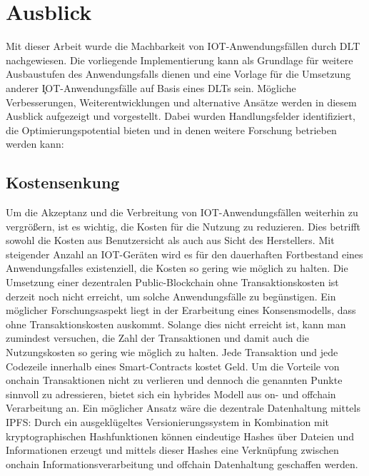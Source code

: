 \chapter{Ausblick}
\label{ch:perspective}
Mit dieser Arbeit wurde die Machbarkeit von \ac{IOT}-Anwendungsfällen durch \ac{DLT} nachgewiesen. Die vorliegende Implementierung kann als Grundlage für weitere Ausbaustufen des Anwendungsfalls dienen und eine Vorlage für die Umsetzung anderer \c{IOT}-Anwendungsfälle auf Basis eines \ac{DLT}s sein. Mögliche Verbesserungen, Weiterentwicklungen und alternative Ansätze werden in diesem Ausblick aufgezeigt und vorgestellt. Dabei wurden Handlungsfelder identifiziert, die Optimierungspotential bieten und in denen weitere Forschung betrieben werden kann:\\


\section{Kostensenkung}
\label{sec:perspective:costs}
Um die Akzeptanz und die Verbreitung von \ac{IOT}-Anwendungsfällen weiterhin zu vergrößern, ist es wichtig, die Kosten für die Nutzung zu reduzieren. Dies betrifft sowohl die Kosten aus Benutzersicht als auch aus Sicht des Herstellers. Mit steigender Anzahl an \ac{IOT}-Geräten wird es für den dauerhaften Fortbestand eines Anwendungsfalles existenziell, die Kosten so gering wie möglich zu halten. Die Umsetzung einer dezentralen Public-Blockchain ohne Transaktionskosten ist derzeit noch nicht erreicht, um solche Anwendungsfälle zu begünstigen. Ein möglicher Forschungsaspekt liegt in der Erarbeitung eines Konsensmodells, dass ohne Transaktionskosten auskommt. Solange dies nicht erreicht ist, kann man zumindest versuchen, die Zahl der Transaktionen und damit auch die Nutzungskosten so gering wie möglich zu halten. Jede Transaktion und jede Codezeile innerhalb eines Smart-Contracts kostet Geld. Um die Vorteile von onchain Transaktionen nicht zu verlieren und dennoch die genannten Punkte sinnvoll zu adressieren, bietet sich ein hybrides Modell aus on- und offchain Verarbeitung an. Ein möglicher Ansatz wäre die dezentrale Datenhaltung mittels \ac{IPFS}: Durch ein ausgeklügeltes Versionierungssystem in Kombination mit kryptographischen Hashfunktionen können eindeutige Hashes über Dateien und Informationen erzeugt und mittels dieser Hashes eine Verknüpfung zwischen onchain Informationsverarbeitung und offchain Datenhaltung geschaffen werden.\\
